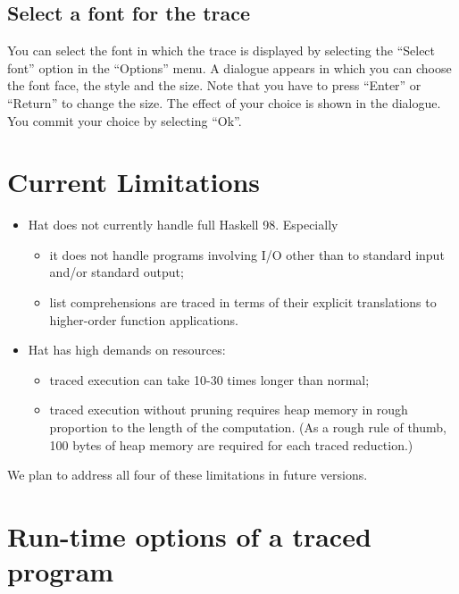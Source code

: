 \documentclass[12pt]{article}
\begin{document}
\subsection{Select a font for the trace}

You can select the font in which the trace is displayed by selecting the ``Select font'' option in the ``Options'' menu. A dialogue appears in which you can choose the font face, the style and the size. Note that you have to press ``Enter'' or ``Return'' to change the size. The effect of your choice is shown in the dialogue. You commit your choice by selecting ``Ok''.


\section{Current Limitations}

\begin{itemize}
\item
Hat does not currently handle full Haskell 98. Especially
\begin{itemize}
\item
it does not handle programs involving
I/O other than to standard input and/or standard output;
\item
list comprehensions are traced in terms of their explicit
translations to higher-order function applications.
\end{itemize}

\item
Hat has high demands on resources:
\begin{itemize}
\item
traced execution can take 10-30 times longer than normal;
\item
traced execution without pruning requires heap memory in
rough proportion to the length of the computation.
(As a rough rule of thumb, 100 bytes of heap memory are
required for each traced reduction.)
\end{itemize}

\end{itemize}

We plan to address all four of these limitations in future versions.


\appendix

\newpage
\section{Run-time options of a traced program}
\end{document}
